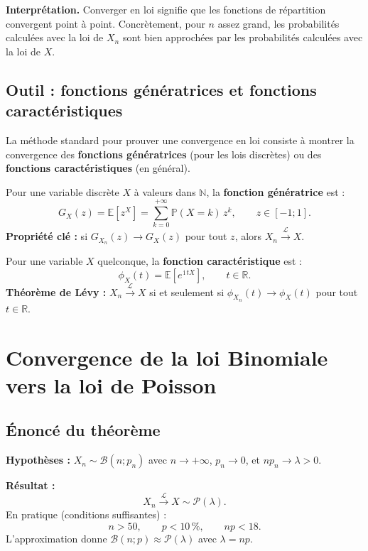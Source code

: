 \documentclass[11pt,a4paper]{article}
\renewcommand{\P}{\mathbb{P}}
\newcommand{\E}{\mathbb{E}}
\newcommand{\R}{\mathbb{R}}
\begin{document}
\textbf{Interpr\'etation.} Converger en loi signifie que les fonctions de r\'epartition convergent point \`a point. Concr\`etement, pour $n$ assez grand, les probabilit\'es calcul\'ees avec la loi de $X_n$ sont bien approch\'ees par les probabilit\'es calcul\'ees avec la loi de $X$.

\subsection{Outil : fonctions g\'en\'eratrices et fonctions caract\'eristiques}

La m\'ethode standard pour prouver une convergence en loi consiste \`a montrer la convergence des \textbf{fonctions g\'en\'eratrices} (pour les lois discr\`etes) ou des \textbf{fonctions caract\'eristiques} (en g\'en\'eral).

\begin{defbox}
Pour une variable discr\`ete $X$ \`a valeurs dans $\mathbb{N}$, la \textbf{fonction g\'en\'eratrice} est :
$$G_X(z) = \E\!\left[z^X\right] = \sum_{k=0}^{+\infty} \P(X=k)\,z^k, \qquad z\in[-1;1].$$
\textbf{Propri\'et\'e cl\'e :} si $G_{X_n}(z) \to G_X(z)$ pour tout $z$, alors $X_n \xrightarrow{\mathcal{L}} X$.
\end{defbox}

\begin{defbox}
Pour une variable $X$ quelconque, la \textbf{fonction caract\'eristique} est :
$$\phi_X(t) = \E\!\left[e^{\,\mathrm{i}\,tX}\right], \qquad t\in\R.$$
\textbf{Th\'eor\`eme de L\'evy :} $X_n \xrightarrow{\mathcal{L}} X$ si et seulement si $\phi_{X_n}(t) \to \phi_X(t)$ pour tout $t\in\R$.
\end{defbox}

\section{Convergence de la loi Binomiale vers la loi de Poisson}

\subsection{\'Enonc\'e du th\'eor\`eme}

\begin{thmbox}
\textbf{Hypoth\`eses :} $X_n \sim \mathcal{B}(n;p_n)$ avec $n\to+\infty$, $p_n\to 0$, et $np_n \to \lambda > 0$.

\textbf{R\'esultat :}
$$X_n \xrightarrow{\;\mathcal{L}\;} X \sim \mathcal{P}(\lambda).$$
En pratique (conditions suffisantes) :
$$n > 50, \qquad p < 10\,\%, \qquad np < 18.$$
L'approximation donne $\mathcal{B}(n;p) \approx \mathcal{P}(\lambda)$ avec $\lambda = np$.
\end{thmbox}
\end{document}
